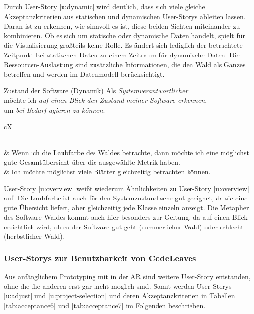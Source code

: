 Durch User-Story \ref{u:dynamic} wird deutlich, dass sich viele gleiche Akzeptanzkriterien aus statischen und dynamischen User-Storys ableiten lassen. Daran ist zu erkennen, wie sinnvoll es ist, diese beiden Sichten miteinander zu kombinieren. Ob es sich um statische oder dynamische Daten handelt, spielt für die Visualisierung großteils keine Rolle. Es ändert sich lediglich der betrachtete Zeitpunkt bei statischen Daten zu einem Zeitraum für dynamische Daten. Die Ressourcen-Auslastung sind zusätzliche Informationen, die den Wald als Ganzes betreffen und werden im Datenmodell berücksichtigt.

\begin{userstory}[u:overview]{Zustand der Software (Dynamik)}
  Als \textit{Systemverantwortlicher}\\
  möchte ich \textit{auf einen Blick den Zustand meiner Software erkennen},\\
  um \textit{bei Bedarf agieren zu können}.
\end{userstory}

\setaccid
\begin{tabularx}{\textwidth}{cX}
	\caption{Akzeptanzkriterien zu User-Story \ref{u:overview}} \label{tab:acceptance5}\\
     & Wenn ich die Laubfarbe des Waldes betrachte, dann möchte ich eine möglichst gute Gesamtübersicht über die ausgewählte Metrik haben.\\
     & Ich möchte möglichst viele Blätter gleichzeitig betrachten können.\\
\end{tabularx}

User-Story \ref{u:overview} weißt wiederum Ähnlichkeiten zu User-Story \ref{u:overview} auf. Die Laubfarbe ist auch für den Systemzustand sehr gut geeignet, da sie eine gute Übersicht liefert, aber gleichzeitig jede Klasse einzeln anzeigt. Die Metapher des Software-Waldes kommt auch hier besonders zur Geltung, da auf einen Blick ersichtlich wird, ob es der Software gut geht (sommerlicher Wald) oder schlecht (herbstlicher Wald).

\subsubsection*{User-Storys zur Benutzbarkeit von CodeLeaves}

Aus anfänglichem Prototyping mit in der AR sind weitere User-Story entstanden, ohne die die anderen erst gar nicht möglich sind. Somit werden User-Storys \ref{u:adjust} und \ref{u:project-selection} und deren Akzeptanzkriterien in Tabellen \ref{tab:acceptance6} und \ref{tab:acceptance7} im Folgenden beschrieben.

